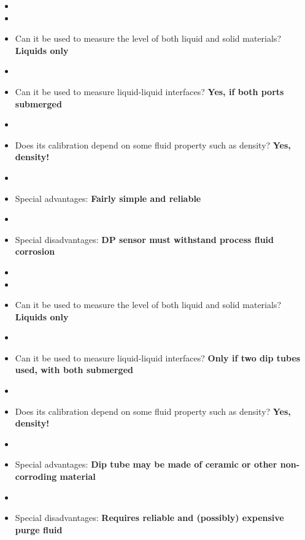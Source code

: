 \vskip 10pt

\begin{itemize}
\goodbreak
\item{} 
\item\item{} Can it be used to measure the level of both liquid and solid materials? {\bf Liquids only}
\item\item{} Can it be used to measure liquid-liquid interfaces? {\bf Yes, if both ports submerged}
\item\item{} Does its calibration depend on some fluid property such as density? {\bf Yes, density!}
\item\item{} Special advantages: {\bf Fairly simple and reliable}
\item\item{} Special disadvantages: {\bf DP sensor must withstand process fluid corrosion}
\end{itemize}

\vskip 10pt

\begin{itemize}
\goodbreak
\item{} 
\item\item{} Can it be used to measure the level of both liquid and solid materials? {\bf Liquids only}
\item\item{} Can it be used to measure liquid-liquid interfaces? {\bf Only if two dip tubes used, with both submerged}
\item\item{} Does its calibration depend on some fluid property such as density? {\bf Yes, density!}
\item\item{} Special advantages: {\bf Dip tube may be made of ceramic or other non-corroding material}
\item\item{} Special disadvantages: {\bf Requires reliable and (possibly) expensive purge fluid}
\end{itemize}

\vskip 10pt

